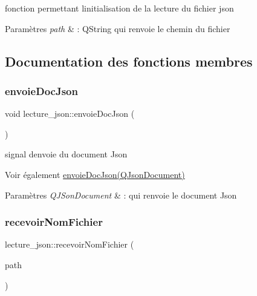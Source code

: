 fonction permettant l\textquotesingle{}initialisation de la lecture du fichier json 


\begin{DoxyParams}{Paramètres}
{\em path} & \+: Q\+String qui renvoie le chemin du fichier \\
\hline
\end{DoxyParams}


\subsection{Documentation des fonctions membres}
\mbox{\label{classlecture__json_a27d0869b75b2fcbe687888b390964f79}} 
\subsubsection{\texorpdfstring{envoie\+Doc\+Json}{envoieDocJson}}
{\footnotesize\ttfamily void lecture\+\_\+json\+::envoie\+Doc\+Json (\begin{DoxyParamCaption}\item[{Q\+Json\+Document}]{ }\end{DoxyParamCaption})\hspace{0.3cm}{\ttfamily [signal]}}



signal d\textquotesingle{}envoie du document Json 

\begin{DoxySeeAlso}{Voir également}
\hyperlink{classlecture__json_a27d0869b75b2fcbe687888b390964f79}{envoie\+Doc\+Json(\+Q\+Json\+Document)} 
\end{DoxySeeAlso}

\begin{DoxyParams}{Paramètres}
{\em Q\+J\+Son\+Document} & \+: qui renvoie le document Json \\
\hline
\end{DoxyParams}
\mbox{\label{classlecture__json_a9b907076c0d37125a6ab35b5906c9880}} 
\subsubsection{\texorpdfstring{recevoir\+Nom\+Fichier}{recevoirNomFichier}}
{\footnotesize\ttfamily lecture\+\_\+json\+::recevoir\+Nom\+Fichier (\begin{DoxyParamCaption}\item[{Q\+String}]{path }\end{DoxyParamCaption})\hspace{0.3cm}{\ttfamily [slot]}}



